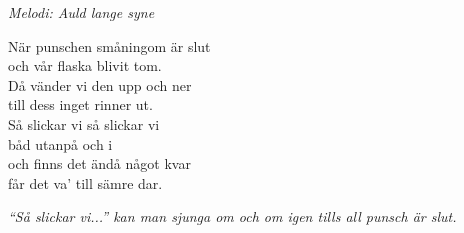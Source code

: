 {\footnotesize\textit{Melodi: Auld lange syne}}\par
\vspace{10pt}
När punschen småningom är slut\\
och vår flaska blivit tom.\\
Då vänder vi den upp och ner\\
till dess inget rinner ut.\\
\revrpt Så slickar vi så slickar vi\\
båd utanpå och i\\
och finns det ändå något kvar\\
får det va' till sämre dar.\rpt\par
\vspace{10pt}
{\footnotesize\textit{``Så slickar vi...'' kan man sjunga om och om igen tills all punsch är slut.}}
